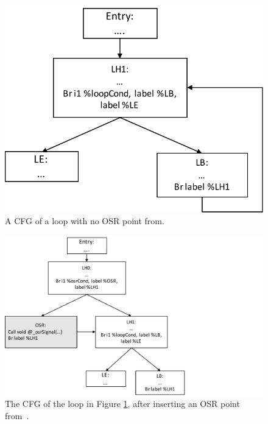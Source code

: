 \begin{figure}[h]
\centering
\includegraphics[scale=0.5]{Figures/BaseCFG.pdf}
\decoRule
\caption[A CFG of a loop with no OSR point]{A CFG of a loop with no OSR point from\cite{lameed2013modular}.}
\label{BaseCFG}
\end{figure}

\begin{figure}[h]
\centering
\includegraphics[scale=0.5]{Figures/InsertCFG.pdf}
\decoRule
\caption[The CFG of the loop in Figure \ref{BaseCFG}, after inserting an OSR point]{The CFG of the loop in Figure \ref{BaseCFG}, after inserting an OSR point from~\cite{lameed2013modular}.}
\label{InsertCFG}
\end{figure}

